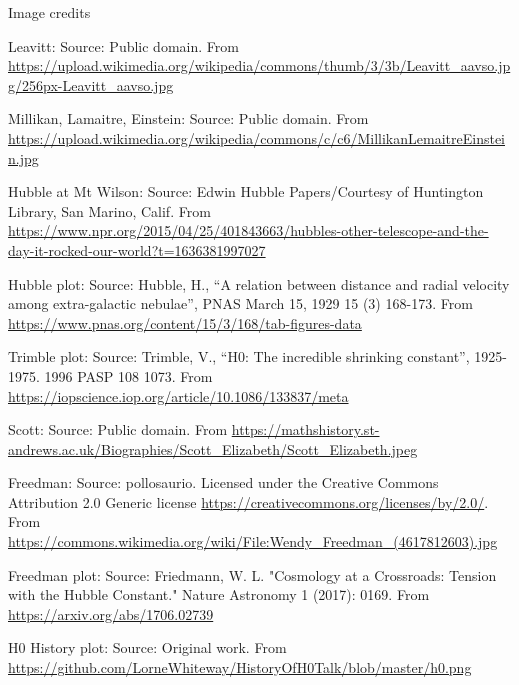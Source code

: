 \documentclass[usenames,dvipsnames,12pt,compress]{beamer}
\begin{document}
\begin{frame}{Image credits}
  \begin{enumerate}\addtocounter{enumi}{10}
  \tiny {
  \item{Leavitt: Source: Public domain. From \url{https://upload.wikimedia.org/wikipedia/commons/thumb/3/3b/Leavitt_aavso.jpg/256px-Leavitt_aavso.jpg}}
  \item{Millikan, Lamaitre, Einstein: Source: Public domain. From \url{https://upload.wikimedia.org/wikipedia/commons/c/c6/MillikanLemaitreEinstein.jpg}}
  \item{Hubble at Mt Wilson: Source: Edwin Hubble Papers/Courtesy of Huntington Library, San Marino, Calif. From \url{https://www.npr.org/2015/04/25/401843663/hubbles-other-telescope-and-the-day-it-rocked-our-world?t=1636381997027}}
  \item{Hubble plot: Source: Hubble, H., ``A relation between distance and radial velocity among extra-galactic nebulae'', PNAS March 15, 1929 15 (3) 168-173. From \url{https://www.pnas.org/content/15/3/168/tab-figures-data}}
  \item{Trimble plot: Source: Trimble, V., ``H0: The incredible shrinking constant'', 1925-1975. 1996 PASP 108 1073. From \url{https://iopscience.iop.org/article/10.1086/133837/meta}}
  \item{Scott: Source: Public domain. From \url{https://mathshistory.st-andrews.ac.uk/Biographies/Scott_Elizabeth/Scott_Elizabeth.jpeg}}
  \item{Freedman: Source: pollosaurio. Licensed under the Creative Commons Attribution 2.0 Generic license \url{https://creativecommons.org/licenses/by/2.0/}. From \url{https://commons.wikimedia.org/wiki/File:Wendy_Freedman_(4617812603).jpg}}
  \item{Freedman plot: Source: Friedmann, W. L. "Cosmology at a Crossroads: Tension with the Hubble Constant." Nature Astronomy 1 (2017): 0169. From \url{https://arxiv.org/abs/1706.02739}}
  \item{H0 History plot: Source: Original work. From \url{https://github.com/LorneWhiteway/HistoryOfH0Talk/blob/master/h0.png}}
  } %
  \end{enumerate}
\end{frame}
\end{document}
